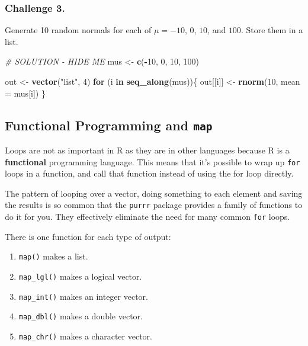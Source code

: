 \documentclass[]{book}
\newenvironment{Shaded}{\begin{snugshade}}{\end{snugshade}}
\newcommand{\KeywordTok}[1]{\textcolor[rgb]{0.13,0.29,0.53}{\textbf{#1}}}
\newcommand{\DataTypeTok}[1]{\textcolor[rgb]{0.13,0.29,0.53}{#1}}
\newcommand{\DecValTok}[1]{\textcolor[rgb]{0.00,0.00,0.81}{#1}}
\newcommand{\StringTok}[1]{\textcolor[rgb]{0.31,0.60,0.02}{#1}}
\newcommand{\CommentTok}[1]{\textcolor[rgb]{0.56,0.35,0.01}{\textit{#1}}}
\newcommand{\ControlFlowTok}[1]{\textcolor[rgb]{0.13,0.29,0.53}{\textbf{#1}}}
\newcommand{\OperatorTok}[1]{\textcolor[rgb]{0.81,0.36,0.00}{\textbf{#1}}}
\newcommand{\NormalTok}[1]{#1}
\providecommand{\tightlist}{%
  \setlength{\itemsep}{0pt}\setlength{\parskip}{0pt}}
\begin{document}
\subsubsection*{Challenge 3.}\label{challenge-3.-3}

Generate 10 random normals for each of \(\mu = -10\), \(0\), \(10\), and
\(100\). Store them in a list.

\begin{Shaded}
\begin{Highlighting}[]
\CommentTok{# SOLUTION - HIDE ME}
\NormalTok{mus <-}\StringTok{ }\KeywordTok{c}\NormalTok{(}\OperatorTok{-}\DecValTok{10}\NormalTok{, }\DecValTok{0}\NormalTok{, }\DecValTok{10}\NormalTok{, }\DecValTok{100}\NormalTok{)}

\NormalTok{out <-}\StringTok{ }\KeywordTok{vector}\NormalTok{(}\StringTok{"list"}\NormalTok{, }\DecValTok{4}\NormalTok{)}
\ControlFlowTok{for}\NormalTok{ (i }\ControlFlowTok{in} \KeywordTok{seq_along}\NormalTok{(mus))\{}
\NormalTok{  out[[i]] <-}\StringTok{ }\KeywordTok{rnorm}\NormalTok{(}\DecValTok{10}\NormalTok{, }\DataTypeTok{mean =}\NormalTok{ mus[i])}
\NormalTok{\}}
\end{Highlighting}
\end{Shaded}

\subsection{\texorpdfstring{Functional Programming and
\texttt{map}}{Functional Programming and map}}\label{functional-programming-and-map}

Loops are not as important in R as they are in other languages because R
is a \textbf{functional} programming language. This means that it's
possible to wrap up \texttt{for} loops in a function, and call that
function instead of using the for loop directly.

The pattern of looping over a vector, doing something to each element
and saving the results is so common that the \texttt{purrr} package
provides a family of functions to do it for you. They effectively
eliminate the need for many common \texttt{for} loops.

There is one function for each type of output:

\begin{enumerate}
\def\labelenumi{\arabic{enumi}.}
\tightlist
\item
  \texttt{map()} makes a list.
\item
  \texttt{map\_lgl()} makes a logical vector.
\item
  \texttt{map\_int()} makes an integer vector.
\item
  \texttt{map\_dbl()} makes a double vector.
\item
  \texttt{map\_chr()} makes a character vector.
\end{enumerate}
\end{document}
